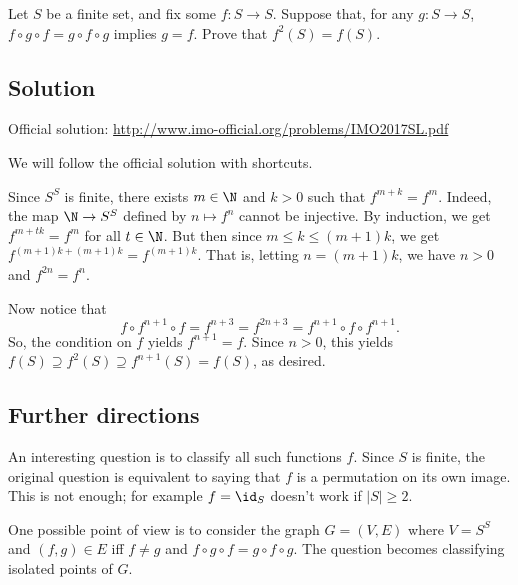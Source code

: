Let $S$ be a finite set, and fix some $f : S \to S$.
Suppose that, for any $g : S \to S$, $f \circ g \circ f = g \circ f \circ g$ implies $g = f$.
Prove that $f^2(S) = f(S)$.



\subsection*{Solution}

Official solution: \url{http://www.imo-official.org/problems/IMO2017SL.pdf}

We will follow the official solution with shortcuts.

Since $S^S$ is finite, there exists $m \in \N$ and $k > 0$ such that $f^{m + k} = f^m$.
Indeed, the map $\N \to S^S$ defined by $n \mapsto f^n$ cannot be injective.
By induction, we get $f^{m + tk} = f^m$ for all $t \in \N$.
But then since $m \leq k \leq (m + 1) k$, we get $f^{(m + 1) k + (m + 1) k} = f^{(m + 1) k}$.
That is, letting $n = (m + 1) k$, we have $n > 0$ and $f^{2n} = f^n$.

Now notice that
\[ f \circ f^{n + 1} \circ f = f^{n + 3} = f^{2n + 3} = f^{n + 1} \circ f \circ f^{n + 1}. \]
So, the condition on $f$ yields $f^{n + 1} = f$.
Since $n > 0$, this yields $f(S) \supseteq f^2(S) \supseteq f^{n + 1}(S) = f(S)$, as desired.



\subsection*{Further directions}

An interesting question is to classify all such functions $f$.
Since $S$ is finite, the original question is equivalent to saying that $f$ is a permutation on its own image.
This is not enough; for example $f = \id_S$ doesn't work if $|S| \geq 2$.

One possible point of view is to consider the graph $G = (V, E)$ where $V = S^S$ and $(f, g) \in E$ iff $f \neq g$ and $f \circ g \circ f = g \circ f \circ g$.
The question becomes classifying isolated points of $G$.
